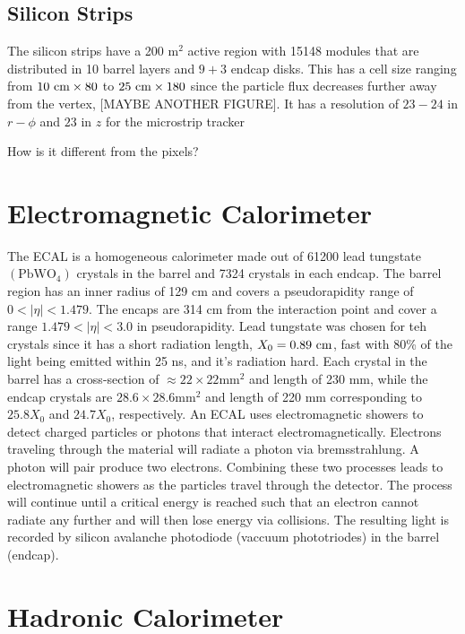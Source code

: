 \subsection{Silicon Strips}
\label{subsec:Strips}

The silicon strips have a 200 m$^2$ active region with 15148 modules that are distributed in 10 barrel layers and $9+3$ endcap disks.
This has a cell size ranging from $10 \text{ cm} \times80$ \mum to $25 \text{ cm} \times 180$ \mum since the particle flux decreases further away from the vertex, [MAYBE ANOTHER FIGURE]. It has a resolution of $23-24$ \mum in $r-\phi$ and $23$ \mum in $z$ for the microstrip tracker

How is it different from the pixels?

\section{Electromagnetic Calorimeter}
\label{sec:ECAL}

The ECAL is a homogeneous calorimeter made out of 61200 lead tungstate $(\text{PbWO}_4)$ crystals in the barrel and 7324 crystals in each endcap. The barrel region has an inner radius of 129 cm and covers a pseudorapidity range of $0<|\eta|<1.479$. The encaps are 314 cm from the interaction point and cover a range $1.479<|\eta|<3.0$ in pseudorapidity. Lead tungstate was chosen for teh crystals since it has a short radiation length, $X_0=0.89\text{ cm}$, fast with 80\% of the light being emitted within 25 ns, and it's radiation hard. Each crystal in the barrel has a cross-section of $\approx22\times22 \text{mm}^2$ and length of 230 mm, while the endcap crystals are $28.6\times28.6 \text{mm}^2$ and length of 220 mm corresponding to $25.8X_0$ and $24.7X_0$, respectively. An ECAL uses electromagnetic showers to detect charged particles or photons that interact electromagnetically. Electrons traveling through the material will radiate a photon via bremsstrahlung. A photon will pair produce two electrons. Combining these two processes leads to electromagnetic showers as the particles travel through the detector. The process will continue until a critical energy is reached such that an electron cannot radiate any further and will then lose energy via collisions. The resulting light is recorded by silicon avalanche photodiode (vaccuum phototriodes) in the barrel (endcap). 

\section{Hadronic Calorimeter}
\label{sec:HCAL}

